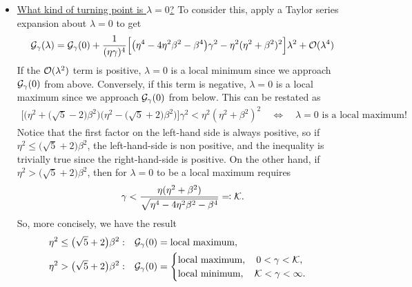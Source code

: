 \documentclass[a4paper,10pt]{article}
\begin{document}
{\begin{itemize}
\begin{enumerate}
\end{enumerate}


\item \underline{What kind of turning point is $\lambda = 0$?} To consider this, apply a Taylor series expansion about $\lambda = 0$ to get
\begin{align}
\label{eq:G_taylor}
{\cal G}_{\gamma}(\lambda) 
= 
{\cal G}_{\gamma}(0) 
+
\frac{1}{(\eta \gamma)^4} 
\Big[ 
\big( \eta^4 - 4 \eta^2 \beta^2 - \beta^4 \big) \gamma^2  - \eta^2 (\eta^2 + \beta^2)^2 
\Big] \lambda^2
+ 
{\cal O}(\lambda^4)
\end{align}
If the ${\cal O}(\lambda^2)$ term is positive, $\lambda = 0$ is a local minimum since we approach ${\cal G}_{\gamma}(0)$ from above. Conversely, if this term is negative, $\lambda = 0$ is a local maximum since we approach ${\cal G}_{\gamma}(0)$ from below. This can be restated as
\begin{align}
\Big[ \big(\eta^2 + \big(\sqrt{5}-2 \big) \beta^2 \big) \big(\eta^2 - \big( \sqrt{5}+2 \big) \beta^2 \big) \Big] \gamma^2 < \eta^2 (\eta^2 + \beta^2)^2
\quad 
\Longleftrightarrow 
\quad
\lambda = 0 \textrm{ is a local maximum!}
\end{align}
Notice that the first factor on the left-hand side is always positive, so if $\eta^2 \leq \big(\sqrt{5}+2 \big) \beta^2$, the left-hand-side is non positive, and the inequality is trivially true since the right-hand-side is positive. On the other hand, if $\eta^2 > \big(\sqrt{5}+2 \big) \beta^2$, then for $\lambda = 0$ to be a local maximum requires
\begin{align}
\label{eq:Kdef}
\gamma < \frac{\eta (\eta^2 + \beta^2)}{\sqrt{\eta^4 - 4 \eta^2 \beta^2 - \beta^4}} \eqqcolon {\cal K}. 
\end{align}
So, more concisely, we have the result
\begin{equation}
\label{eq:G0_class}
\begin{aligned}
\eta^2 \leq \big(\sqrt{5}+2 \big) \beta^2:& 
\quad 
{\cal G}_{\gamma}(0) = \textrm{local maximum}, \\
\eta^2 > \big(\sqrt{5}+2 \big) \beta^2:&
\quad
{\cal G}_{\gamma}(0) = 
\begin{cases}
\textrm{local maximum}, \quad  0 < \gamma < {\cal K}, \\
\textrm{local minimum}, \quad  {\cal K} <  \gamma  < \infty.
\end{cases}
\end{aligned}
\end{equation}


\end{itemize}}
\end{document}
